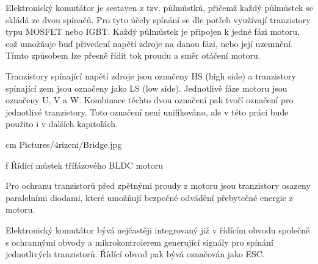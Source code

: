 Elektronický komutátor je sestaven z tzv. půlmůstků, přičemž každý půlmůstek se skládá
 ze dvou spínačů. 
 Pro tyto účely spínání se dle potřeb využívají tranzistory typu MOSFET nebo IGBT. 
 Každý půlmůstek je připojen k jedné fázi motoru, což umožňuje buď přivedení napětí zdroje 
 na danou fázi, nebo její uzemnění. Tímto způsobem lze přesně řídit tok proudu a směr otáčení motoru.

Tranzistory spínající napětí zdroje jsou označeny HS (high side) a tranzistory spínající zem jsou označeny jako LS (low side).
Jednotlivé fáze motoru jsou označeny U, V a W. Kombinace těchto dvou označení pak tvoří označení pro jednotlivé tranzistory.
Toto označení není unifikováno, ale v této práci bude použito i v dalších kapitolách. 

\medskip
{} cm \cinspic Pictures/4rizeni/Bridge.jpg 
\caption/f Řídící můstek třífázového BLDC motoru
\medskip

Pro ochranu tranzistorů před zpětnými proudy z motoru jsou tranzistory osazeny paralelními diodami, které 
umožňují bezpečné odvádění přebytečné energie z motoru.

Elektronický komutátor bývá nejčastěji integrovaný již v řídícím obvodu společně s ochrannými obvody a mikrokontrolerem 
generující signály pro spínání jednotlivých tranzistorů. Řídící obvod pak bývá označován jako ESC.
